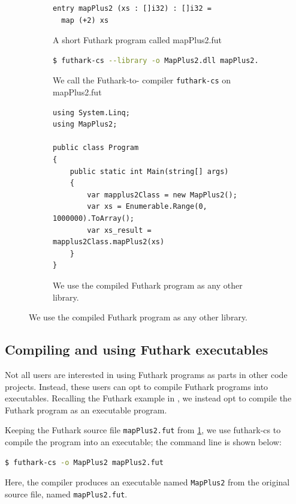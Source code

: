 \begin{figure}[H]
\begin{subfigure}
  \centering
  \begin{lstlisting}[language=Futhark]
entry mapPlus2 (xs : []i32) : []i32 =
  map (+2) xs
  \end{lstlisting}
  \caption{A short Futhark program called mapPlus2.fut}
  \label{fig:shortfutharkprogram3'}
\end{subfigure}

\begin{subfigure}
  \centering
  \begin{lstlisting}[language=sh]
$ futhark-cs --library -o MapPlus2.dll mapPlus2.fut
  \end{lstlisting}
  \caption{We call the Futhark-to-\csharp{} compiler \texttt{futhark-cs} on
    mapPlus2.fut}
  \label{fig:shortfutharkprogram4'}
\end{subfigure}

\begin{subfigure}
  \centering
\begin{verbatim}
using System.Linq;
using MapPlus2;

public class Program
{
    public static int Main(string[] args)
    {
        var mapplus2Class = new MapPlus2();
        var xs = Enumerable.Range(0, 1000000).ToArray();
        var xs_result = mapplus2Class.mapPlus2(xs)
    }
}
\end{verbatim}
  \caption{We use the compiled Futhark program as any other library.}
  \label{fig:shortfutharkprogram5'}
\end{subfigure}
\end{figure}

\subsection{Compiling and using Futhark \csharp{} executables}
\label{subsec:futharkcsexe}
Not all users are interested in using Futhark programs as parts in other code
projects. Instead, these users can opt to compile Futhark programs into
executables. Recalling the Futhark example in
,
we instead opt to compile the Futhark program as an executable program.

Keeping the Futhark source file \texttt{mapPlus2.fut} from
\ref{fig:shortfutharkprogram3'}, we use futhark-cs to compile the program into
an executable; the command line is shown below: %
  \begin{lstlisting}[language=sh]
$ futhark-cs -o MapPlus2 mapPlus2.fut
  \end{lstlisting}
%
Here, the compiler produces an executable named \texttt{MapPlus2} from the
original source file, named {\tt mapPlus2.fut}.

